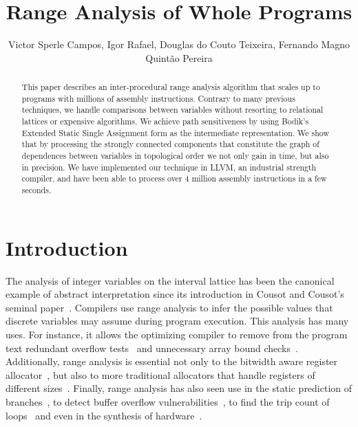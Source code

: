 \documentclass{llncs}
\begin{document}
\title {Range Analysis of Whole Programs}

\author{Victor Sperle Campos, Igor Rafael, Douglas do Couto Teixeira,
Fernando Magno Quint\~{a}o Pereira}



\maketitle

\begin{abstract}
This paper describes an inter-procedural range analysis algorithm that scales
up to programs with millions of assembly instructions.
Contrary to many previous techniques, we handle comparisons between variables
without resorting to relational lattices or expensive algorithms.
We achieve path sensitiveness by using Bodik's Extended Static Single
Assignment form as the intermediate representation.
We show that by processing the strongly connected components that constitute
the graph of dependences between variables in topological order we not only
gain in time, but also in precision.
We have implemented our technique in LLVM, an industrial strength compiler,
and have been able to process over 4 million assembly instructions in a
few seconds.
\end{abstract}

\section{Introduction}
\label{sec:intro}

The analysis of integer variables on the interval lattice has been the
canonical example of abstract interpretation since its introduction in
Cousot and Cousot's seminal paper~\cite{Cousot77}.
Compilers use range analysis to infer the possible values that discrete
variables may assume during program execution.
This analysis has many uses.
For instance, it allows the optimizing compiler to remove from the program text
redundant overflow tests~\cite{Sol11} and unnecessary array bound
checks~\cite{Bodik00}.
Additionally, range analysis is essential not only to the bitwidth aware
register allocator~\cite{Barik06,Tallam03}, but also to more traditional
allocators that handle registers of different
sizes~\cite{Kong98,Pereira08,Scholz02}.
Finally, range analysis has also seen use in the static prediction of
branches~\cite{Patterson95}, to detect buffer overflow
vulnerabilities~\cite{Simon08,Wagner00}, to find the trip count of
loops~\cite{Lokuciejewski09}
and even in the synthesis of hardware~\cite{Cong05,Mahlke01}.
\end{document}
